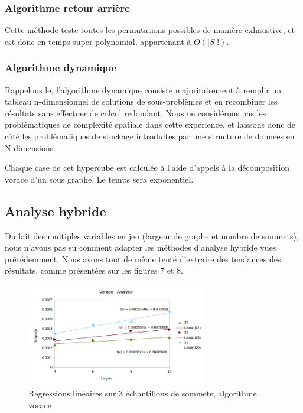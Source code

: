 \documentclass[10pt,a4paper]{article}
\begin{document}
\subsubsection{Algorithme retour arrière}

Cette méthode teste toutes les permutations possibles de manière exhaustive, et est donc en temps super-polynomial, appartenant à $ O (|S|!) $.

\subsubsection{Algorithme dynamique}

Rappelons le, l'algorithme dynamique consiste majoritairement à remplir un tableau n-dimensionnel de solutions de sous-problèmes et en recombiner les résultats sans effectuer de calcul redondant. Nous ne considérons pas les problématiques de complexité spatiale dans cette expérience, et laissons donc de côté les problématiques de stockage introduites par une structure de données en N dimensions.

Chaque case de cet hypercube est calculée à l'aide d'appels à la décomposition vorace d'un sous graphe. Le temps sera exponentiel.

\subsection{Analyse hybride}

Du fait des multiples variables en jeu (largeur de graphe et nombre de sommets), nous n'avons pas su comment adapter les méthodes d'analyse hybride vues précédemment. Nous avons tout de même tenté d'extraire des tendances des résultats, comme présentées sur les figures 7 et 8.

\begin{figure}[h!]
	\centering
	\includegraphics[width=0.7\textwidth]{spreadsheet/graph5}
	\caption{Regressions linéaires sur 3 échantillons de sommets, algorithme vorace}
\end{figure}
\end{document}
